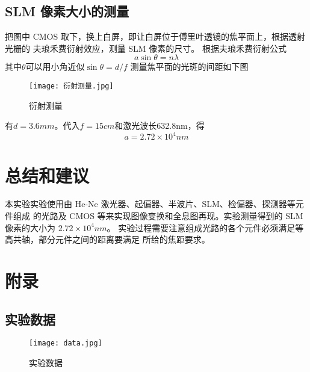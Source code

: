 \documentclass{whureport}
\begin{document}
\begin{multicols}{2}
\subsection{SLM 像素大小的测量}
把图中 CMOS 取下，换上白屏，即让白屏位于傅里叶透镜的焦平面上，根据透射光栅的
夫琅禾费衍射效应，测量 SLM 像素的尺寸。
根据夫琅禾费衍射公式
\begin{equation}
    a\sin{\theta}=n\lambda
\end{equation}
其中$\theta$可以用小角近似$\sin{\theta}=d/f$
测量焦平面的光斑的间距如下图

\begin{figure}[H]
    \centering
    \texttt{[image: 衍射测量.jpg]}
    \caption{衍射测量}
    \label{fig:diffraction-measurement}
    \end{figure}

有$d=3.6mm$。代入$f=15cm$和激光波长632.8nm，得
\begin{equation}
    a=2.72\times 10^4nm
\end{equation}

\section{总结和建议}
本实验实验使用由 He-Ne 激光器、起偏器、半波片、SLM、检偏器、探测器等元件组成
的光路及 CMOS 等来实现图像变换和全息图再现。实验测量得到的 SLM 像素的大小为
$2.72\times 10^4nm$。
实验过程需要注意组成光路的各个元件必须满足等高共轴，部分元件之间的距离要满足
所给的焦距要求。
\end{multicols}
\section{附录}
\subsection{实验数据}
\begin{figure}[H]
	\centering
	\texttt{[image: data.jpg]}
	\caption{实验数据}
	\label{fig:experiment-data}
\end{figure}
\end{document}
